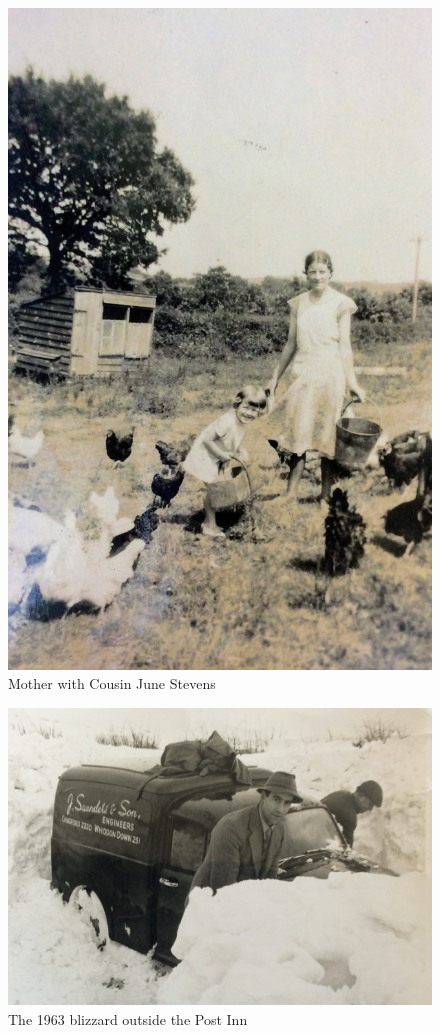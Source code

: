 \begin{figure}
  \centering
  \includegraphics[width=.9\linewidth]{pictures/cropped/Mother with Cousin June.jpg}
  \caption*{Mother with Cousin June Stevens}
\end{figure}

\begin{figure}
  \centering
  \includegraphics[width=.9\linewidth]{pictures/cropped/1963 blizzard outside the Post Inn.jpg}
  \caption*{The 1963 blizzard outside the Post Inn}
\end{figure}


